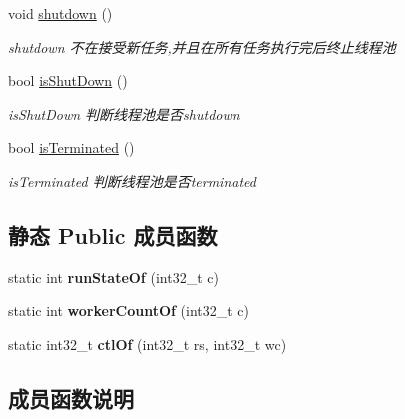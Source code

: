 \begin{DoxyCompactItemize}
\mbox{\label{classThreadPoolExecutor_ad04796913a932a6e465696d7b2656e86}} 
void \hyperlink{classThreadPoolExecutor_ad04796913a932a6e465696d7b2656e86}{shutdown} ()
\begin{DoxyCompactList}\small\item\em shutdown 不在接受新任务,并且在所有任务执行完后终止线程池 \end{DoxyCompactList}\item 
bool \hyperlink{classThreadPoolExecutor_ab2306274cb488e3bcf4d14f6042373f7}{is\+Shut\+Down} ()
\begin{DoxyCompactList}\small\item\em is\+Shut\+Down 判断线程池是否shutdown \end{DoxyCompactList}\item 
bool \hyperlink{classThreadPoolExecutor_a50e41a2102a9c5193b419e382f383620}{is\+Terminated} ()
\begin{DoxyCompactList}\small\item\em is\+Terminated 判断线程池是否terminated \end{DoxyCompactList}\end{DoxyCompactItemize}
\subsection*{静态 Public 成员函数}
\begin{DoxyCompactItemize}
\item 
\mbox{\label{classThreadPoolExecutor_aa7ca2a35d562746df0d77bd043bb75f0}} 
static int {\bfseries run\+State\+Of} (int32\+\_\+t c)
\item 
\mbox{\label{classThreadPoolExecutor_af00080b50ff18ef719078b14b3df7291}} 
static int {\bfseries worker\+Count\+Of} (int32\+\_\+t c)
\item 
\mbox{\label{classThreadPoolExecutor_a73773038a4cce87d62e1c7715670aee7}} 
static int32\+\_\+t {\bfseries ctl\+Of} (int32\+\_\+t rs, int32\+\_\+t wc)
\end{DoxyCompactItemize}


\subsection{成员函数说明}
\mbox{\label{classThreadPoolExecutor_aa700bdf61ac6f9a67411560af2871ee7}} 
